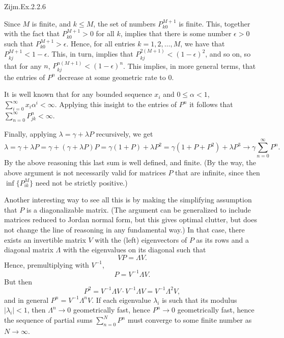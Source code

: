\begin{exercise}
Zijm.Ex.2.2.6
\begin{solution}
  Since $M$ is finite, and $k\leq M$, the set of numbers
  $P^{M+1}_{k0}$ is finite. This, together with the fact that
  $P^{M+1}_{k0}>0$ for all $k$, implies that there is some number
  $\epsilon>0$ such that $P^{M+1}_{k0}>\epsilon$. Hence, for all
  entries $k=1, 2, \ldots, M$, we have that
  $P^{M+1}_{kj} < 1- \epsilon$. This, in turn, implies that
  $P^{2(M+1)}_{kj} < (1- \epsilon)^2$, and so on, so that for any $n$,
  $P^{n(M+1)}_{kj} < (1- \epsilon)^n$. This implies, in more general
  terms, that the entries of $P^n$ decrease at some geometric rate to
  $0$.

  It is well known that for any bounded sequence $x_i$ and
  $0\leq \alpha < 1$, $ \sum_{i=0}^\infty x_i \alpha^i <
  \infty$. Applying this insight to the entries of $P^n$ it follows that 
$\sum_{n=0}^\infty P^n_{jk} < \infty$. 

Finally, applying  $\lambda = \gamma + \lambda P$ recursively, we get
\begin{equation*}
  \lambda = \gamma + \lambda P = \gamma + (\gamma + \lambda P)P = \gamma (1+P) + \lambda P^2 = \gamma(1+P+P^2) + \lambda P^3 \to \gamma \sum_{n=0}^\infty P^n.
\end{equation*}
By the above reasoning this last sum is well defined, and finite.  (By
the way, the above argument is not necessarily valid for matrices $P$
that are infinite, since then $\inf\{P^{M}_{ik}\}$ need not be
strictly positive.)

Another interesting way to see all this is by making the simplifying
assumption that $P$ is a diagonalizable matrix. (The argument can be
generalized to include matrices reduced to Jordan normal form, but
this gives optimal clutter, but does not change the line of reasoning in
any fundamental way.) In that case, there exists an invertible matrix
$V$ with the (left) eigenvectors of $P$ as its rows and a diagonal
matrix $\Lambda$ with the eigenvalues on its diagonal such that
\begin{equation*}
  V P = \Lambda V.
\end{equation*}
Hence, premultiplying with $V^{-1}$, 
\begin{equation*}
  P = V^{-1}\Lambda V.
\end{equation*}
But then
\begin{equation*}
P^2 = V^{-1}\Lambda V \cdot V^{-1}\Lambda V= V^{-1}\Lambda^2 V,
\end{equation*}
and in general $P^n = V^{-1}\Lambda^n V$. If each eigenvalue
$\lambda_i$ is such that its modulus $|\lambda_i| < 1$, then
$\Lambda^n \to 0$ geometrically fast, hence $P^n\to 0$ geometrically
fast, hence the sequence of partial sums $\sum_{n=0}^N P^n$ must
converge to some finite number as $N\to\infty$. 


\end{solution}
\end{exercise}
